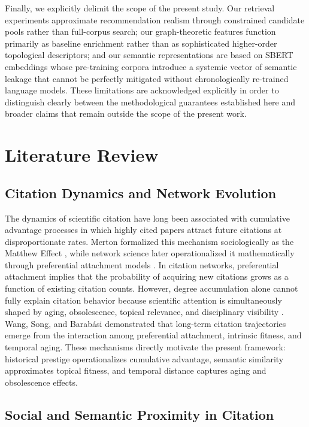 \documentclass[11pt,a4paper]{article}
\begin{document}
Finally, we explicitly delimit the scope of the present study. Our retrieval experiments approximate recommendation realism through constrained candidate pools rather than full-corpus search; our graph-theoretic features function primarily as baseline enrichment rather than as sophisticated higher-order topological descriptors; and our semantic representations are based on SBERT embeddings whose pre-training corpora introduce a systemic vector of semantic leakage that cannot be perfectly mitigated without chronologically re-trained language models. These limitations are acknowledged explicitly in order to distinguish clearly between the methodological guarantees established here and broader claims that remain outside the scope of the present work.

\section{Literature Review}
\label{sec:lit}

\subsection{Citation Dynamics and Network Evolution}

The dynamics of scientific citation have long been associated with cumulative advantage processes in which highly cited papers attract future citations at disproportionate rates. Merton formalized this mechanism sociologically as the Matthew Effect \citep{merton1968matthew}, while network science later operationalized it mathematically through preferential attachment models \citep{barabasi1999emergence}. In citation networks, preferential attachment implies that the probability of acquiring new citations grows as a function of existing citation counts. However, degree accumulation alone cannot fully explain citation behavior because scientific attention is simultaneously shaped by aging, obsolescence, topical relevance, and disciplinary visibility \citep{price1965networks}. Wang, Song, and Barab\'asi \citep{wang2013quantifying} demonstrated that long-term citation trajectories emerge from the interaction among preferential attachment, intrinsic fitness, and temporal aging. These mechanisms directly motivate the present framework: historical prestige operationalizes cumulative advantage, semantic similarity approximates topical fitness, and temporal distance captures aging and obsolescence effects.

\subsection{Social and Semantic Proximity in Citation}
\end{document}
